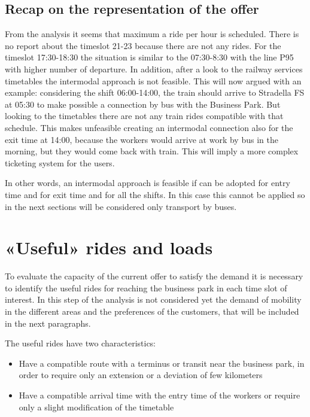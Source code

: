 \subsection{Recap on the representation of the offer}
From the analysis it seems that maximum a ride per hour is scheduled. There is no report about the timeslot 21-23 because there are not any rides. For the timeslot 17:30-18:30 the situation is similar to the 07:30-8:30 with the line P95 with higher number of departure.
In addition, after a look to the railway services timetables the intermodal approach is not feasible. This will now argued with an example: considering the shift 06:00-14:00, the train should arrive to Stradella FS at 05:30 to make possible a connection by bus with the Business Park. But looking to the timetables there are not any train rides compatible with that schedule. This makes unfeasible creating an intermodal connection also for the exit time at 14:00, because the workers would arrive at work by bus in the morning, but they would come back with train. This will imply a more complex ticketing system for the users.
 
In other words, an intermodal approach is feasible if can be adopted for entry time and for exit time and for all the shifts. In this case this cannot be applied so in the next sections will be considered only transport by buses.

\section{«Useful» rides and loads}

To evaluate the capacity of the current offer to satisfy the demand it is necessary to identify the useful rides for reaching the business park in each time slot of interest.
In this step of the analysis is not considered yet the demand of mobility in the different areas and the preferences of the customers, that will be included in the next paragraphs.

The useful rides have two characteristics:

\begin{itemize}
    \item Have a compatible route with a terminus or transit near the business park, in order to require only an extension or a deviation of few kilometers
    \item Have a compatible arrival time with the entry time of the workers or require only a slight modification of the timetable
\end{itemize}

